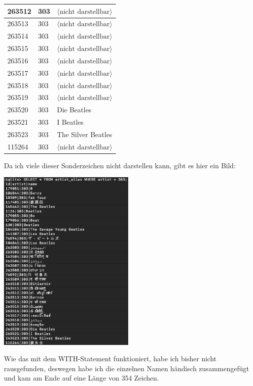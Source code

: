 \documentclass{article}
\begin{document}
\begin{center}
\begin{longtable}{l|l|l}
			263512 & 303 & $\langle\text{nicht darstellbar}\rangle$ \\ \hline
			263513 & 303 & $\langle\text{nicht darstellbar}\rangle$ \\ \hline
			263514 & 303 & $\langle\text{nicht darstellbar}\rangle$ \\ \hline
			263515 & 303 & $\langle\text{nicht darstellbar}\rangle$ \\ \hline
			263516 & 303 & $\langle\text{nicht darstellbar}\rangle$ \\ \hline
			263517 & 303 & $\langle\text{nicht darstellbar}\rangle$ \\ \hline
			263518 & 303 & $\langle\text{nicht darstellbar}\rangle$ \\ \hline
			263519 & 303 & $\langle\text{nicht darstellbar}\rangle$ \\ \hline
			263520 & 303 & Die Beatles \\ \hline
			263521 & 303 & I Beatles \\ \hline
			263523 & 303 & The Silver Beatles \\ \hline
			115264 & 303 & $\langle\text{nicht darstellbar}\rangle$
		\end{longtable}
	\end{center}
	Da ich viele dieser Sonderzeichen nicht darstellen kann, gibt es hier ein Bild:
	\begin{center}
		\includegraphics[width=0.50\textwidth]{aufgabe5}
	\end{center}
	Wie das mit dem WITH-Statement funktioniert, habe ich bisher nicht rausgefunden, deswegen habe ich die einzelnen Namen händisch zusammengefügt und kam am Ende auf eine Länge von 354 Zeichen.
	
\end{document}

